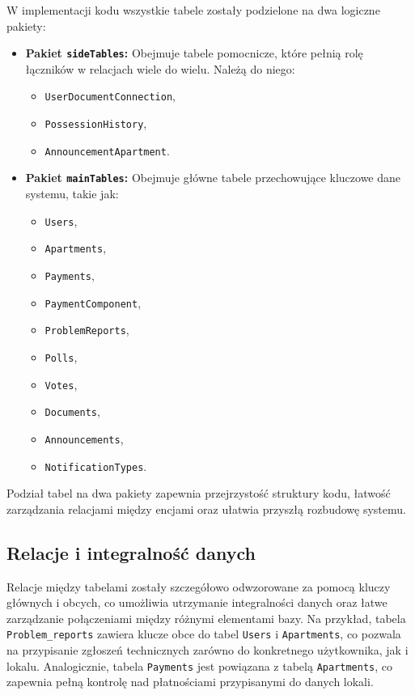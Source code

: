 W implementacji kodu wszystkie tabele zostały podzielone na dwa logiczne pakiety:
\begin{itemize}
    \item \textbf{Pakiet \texttt{sideTables}:} Obejmuje tabele pomocnicze, które pełnią rolę łączników w relacjach wiele do wielu. Należą do niego:
    \begin{itemize}
        \item \texttt{UserDocumentConnection},
        \item \texttt{PossessionHistory},
        \item \texttt{AnnouncementApartment}.
    \end{itemize}

    \item \textbf{Pakiet \texttt{mainTables}:} Obejmuje główne tabele przechowujące kluczowe dane systemu, takie jak:
    \begin{itemize}
        \item \texttt{Users},
        \item \texttt{Apartments},
        \item \texttt{Payments},
        \item \texttt{PaymentComponent},
        \item \texttt{ProblemReports},
        \item \texttt{Polls},
        \item \texttt{Votes},
        \item \texttt{Documents},
        \item \texttt{Announcements},
        \item \texttt{NotificationTypes}.
    \end{itemize}
\end{itemize}

Podział tabel na dwa pakiety zapewnia przejrzystość struktury kodu, łatwość zarządzania relacjami między encjami oraz ułatwia przyszłą rozbudowę systemu.


\subsection{Relacje i integralność danych}

Relacje między tabelami zostały szczegółowo odwzorowane za pomocą kluczy głównych i obcych, co umożliwia utrzymanie integralności danych oraz łatwe zarządzanie połączeniami między różnymi elementami bazy. Na przykład, tabela \texttt{Problem\_reports} zawiera klucze obce do tabel \texttt{Users} i \texttt{Apartments}, co pozwala na przypisanie zgłoszeń technicznych zarówno do konkretnego użytkownika, jak i lokalu. Analogicznie, tabela \texttt{Payments} jest powiązana z tabelą \texttt{Apartments}, co zapewnia pełną kontrolę nad płatnościami przypisanymi do danych lokali.

